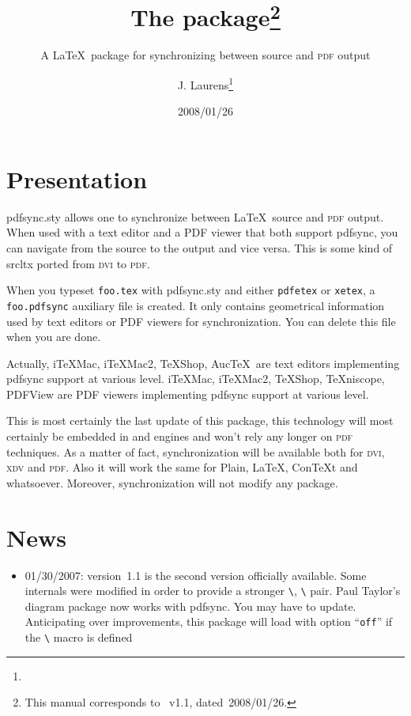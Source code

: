 \documentclass[pagesize=auto, fontsize=12, DIV=11]{scrartcl}
\title{The \pkg{pdfsync} package\thanks{This manual corresponds to \pkg{pdfsync.sty}~v1.1, dated~2008/01/26.}}
\subtitle{A \LaTeX\ package for synchronizing between source and \textsc{pdf} output}
\author{J. Laurens\thanks{\mail{jlaurens@users.sourceforge.net}}}
\date{2008/01/26}
\makeatletter
\newcommand*{\pkg}[1]{\textsf{#1}}
\newcommand*{\cs}[1]{\texttt{\textbackslash#1}}
\newcommand*{\cmd}[1]{\cs{\expandafter\@gobble\string#1}}
\newcommand*{\opt}[1]{\texttt{#1}}
\makeatother
\begin{document}
\maketitle


\section{Presentation}

\pkg{pdfsync.sty} allows one to synchronize between \LaTeX\ source and \textsc{pdf} output.
When used with a text editor and a PDF viewer that both support \pkg{pdfsync},
you can navigate from the source to the output and vice versa.
This is some kind of \pkg{srcltx} ported from \textsc{dvi} to \textsc{pdf}.

When you typeset \texttt{foo.tex} with \pkg{pdfsync.sty} and either \texttt{pdfetex} or \texttt{xetex},
a \texttt{foo.pdfsync} auxiliary file is created. It only contains geometrical information
used by text editors or PDF viewers for synchronization.
You can delete this file when you are done.

Actually, i\TeX Mac, i\TeX Mac2, \TeX Shop, Auc\TeX\ are
text editors implementing \pkg{pdfsync} support at various level.
i\TeX Mac, i\TeX Mac2, \TeX Shop, \TeX niscope, PDFView are
PDF viewers implementing \pkg{pdfsync} support at various level.

This is most certainly the last update of this package,
this technology will most certainly be embedded in  and  engines and won't rely any longer on \textsc{pdf} techniques.
As a matter of fact, synchronization will be available both for \textsc{dvi}, \textsc{xdv} and \textsc{pdf}.
Also it will work the same for Plain, \LaTeX\@, Con\TeX t and whatsoever.
Moreover, synchronization will not modify any package.


\section{News}

\begin{itemize}
\item 01/30/2007: version~1.1 is the second version officially available.
  Some internals were modified in order to provide a stronger \cmd{\pdfsyncstart}, \cmd{\pdfsyncstop} pair.
  Paul Taylor's \pkg{diagram} package now works with \pkg{pdfsync}. You may have to update.
  Anticipating over  improvements, this package will load with option ``\opt{off}'' if the \cmd{\synchronize} macro is defined
\end{itemize}
\end{document}
